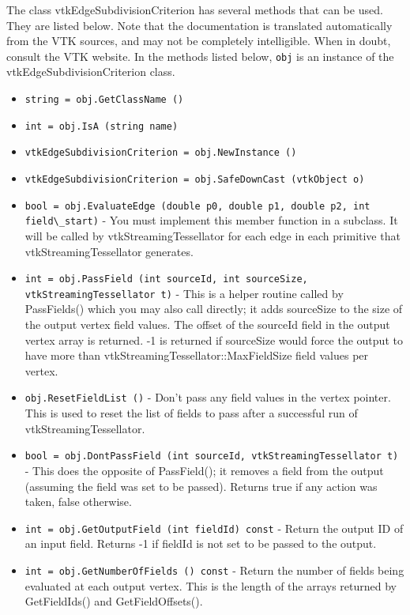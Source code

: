 The class vtkEdgeSubdivisionCriterion has several methods that can be used.
  They are listed below.
Note that the documentation is translated automatically from the VTK sources,
and may not be completely intelligible.  When in doubt, consult the VTK website.
In the methods listed below, \verb|obj| is an instance of the vtkEdgeSubdivisionCriterion class.
\begin{itemize}
\item  \verb|string = obj.GetClassName ()|

\item  \verb|int = obj.IsA (string name)|

\item  \verb|vtkEdgeSubdivisionCriterion = obj.NewInstance ()|

\item  \verb|vtkEdgeSubdivisionCriterion = obj.SafeDownCast (vtkObject o)|

\item  \verb|bool = obj.EvaluateEdge (double p0, double p1, double p2, int field\_start)| -  You must implement this member function in a subclass.
 It will be called by  vtkStreamingTessellator for each
 edge in each primitive that vtkStreamingTessellator generates.

\item  \verb|int = obj.PassField (int sourceId, int sourceSize, vtkStreamingTessellator t)| -  This is a helper routine called by  PassFields() which
 you may also call directly; it adds  sourceSize to the size of
 the output vertex field values. The offset of the  sourceId
 field in the output vertex array is returned.
 -1 is returned if  sourceSize would force the output to have more
 than  vtkStreamingTessellator::MaxFieldSize field values per vertex.

\item  \verb|obj.ResetFieldList ()| -  Don't pass any field values in the vertex pointer.
 This is used to reset the list of fields to pass after a
 successful run of vtkStreamingTessellator.

\item  \verb|bool = obj.DontPassField (int sourceId, vtkStreamingTessellator t)| -  This does the opposite of  PassField(); it removes a field from
 the output (assuming the field was set to be passed).
 Returns true if any action was taken, false otherwise.

\item  \verb|int = obj.GetOutputField (int fieldId) const| -  Return the output ID of an input field.
 Returns -1 if  fieldId is not set to be passed to the output.

\item  \verb|int = obj.GetNumberOfFields () const| -  Return the number of fields being evaluated at each output vertex.
 This is the length of the arrays returned by  GetFieldIds() and
  GetFieldOffsets().

\end{itemize}
